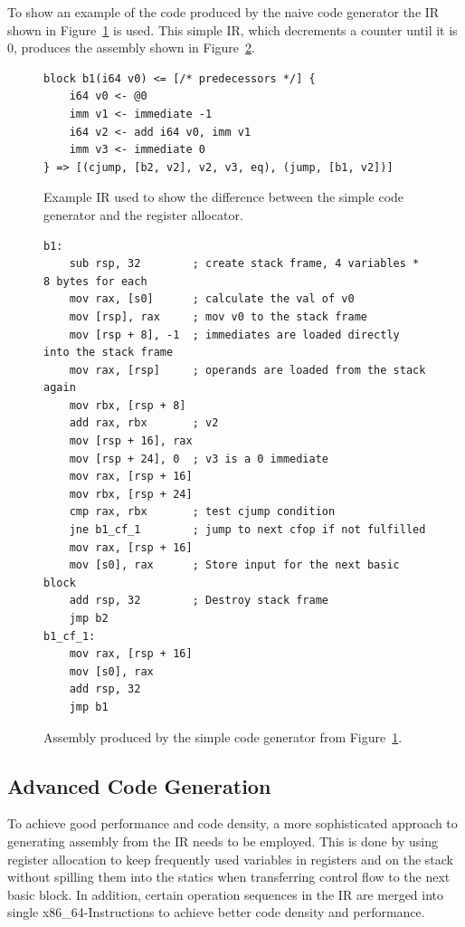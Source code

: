 \documentclass[course=eragp]{aspdoc}
\begin{document}
\par

To show an example of the code produced by the naive code generator the IR shown in Figure~\ref{fig:example_ir} is used.
This simple IR, which decrements a counter until it is 0, produces the assembly shown in Figure~\ref{fig:naive_gen_asm}.
\begin{figure}
    \centering
    \begin{lstlisting}[]
block b1(i64 v0) <= [/* predecessors */] {
    i64 v0 <- @0
    imm v1 <- immediate -1
    i64 v2 <- add i64 v0, imm v1
    imm v3 <- immediate 0
} => [(cjump, [b2, v2], v2, v3, eq), (jump, [b1, v2])]
\end{lstlisting}
    \caption{Example IR used to show the difference between the simple code generator and the register allocator.}\label{fig:example_ir}
\end{figure}

\begin{figure}[h]
    \centering
    \begin{lstlisting}[language={[x86masm]Assembler}]
b1:
    sub rsp, 32        ; create stack frame, 4 variables * 8 bytes for each
    mov rax, [s0]      ; calculate the val of v0
    mov [rsp], rax     ; mov v0 to the stack frame
    mov [rsp + 8], -1  ; immediates are loaded directly into the stack frame
    mov rax, [rsp]     ; operands are loaded from the stack again
    mov rbx, [rsp + 8]
    add rax, rbx       ; v2
    mov [rsp + 16], rax
    mov [rsp + 24], 0  ; v3 is a 0 immediate
    mov rax, [rsp + 16]
    mov rbx, [rsp + 24]
    cmp rax, rbx       ; test cjump condition
    jne b1_cf_1        ; jump to next cfop if not fulfilled
    mov rax, [rsp + 16]
    mov [s0], rax      ; Store input for the next basic block
    add rsp, 32        ; Destroy stack frame
    jmp b2
b1_cf_1:
    mov rax, [rsp + 16]
    mov [s0], rax
    add rsp, 32
    jmp b1
\end{lstlisting}
    \caption{Assembly produced by the simple code generator from Figure~\ref{fig:example_ir}.}\label{fig:naive_gen_asm}
\end{figure}

\subsection{Advanced Code Generation}
To achieve good performance and code density, a more sophisticated approach to generating assembly from the IR needs to
be employed. This is done by using register allocation to keep frequently used variables in registers and on the stack
without spilling them into the statics when transferring control flow to the next basic block. In addition, certain
operation sequences in the IR are merged into single x86\_64-Instructions to achieve better code density and
performance.
\end{document}

